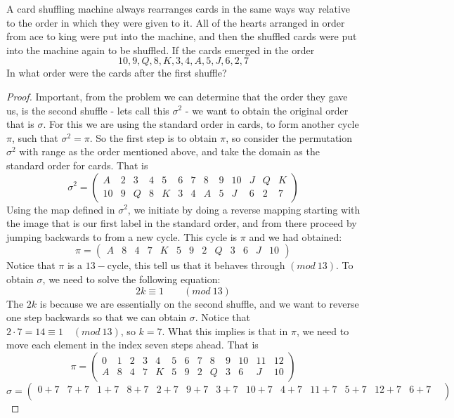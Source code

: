 \begin{assignment}[
  header=HeaderA,
  body=BodyA,
  title={Homework 3},
  duedate={26 February, 2026},
  toc=false,
  toctitle={This appears on the Table of contents.},
  exlist=false
]
\begin{exer}[Problem 5.74]
A card shuffling machine always rearranges cards in the same ways way relative to the order in which they were given to it. All of the hearts arranged in order from ace to king were put into the machine, and then the shuffled cards were put into the machine again to be shuffled. If the cards emerged in the order 
$$10,9, Q,8,K,3,4,A,5,J,6,2,7$$
In what order were the cards after the first shuffle?
\begin{proof}
Important, from the problem we can determine that the order they gave us, is the second shuffle - lets call this $\sigma^2$ - we want to obtain the original order that is $\sigma$. For this we are using the standard order in cards, to form another cycle $\pi$, such that $\sigma^2 = \pi$. So the first step is to obtain $\pi$, so consider the permutation $\sigma^2$ with range as the order mentioned above, and take the domain as the standard order for cards. That is
\[
\sigma^2 = \begin{pmatrix}
  A & 2  & 3 & 4 & 5 & 6 & 7 & 8 & 9 & 10 & J & Q & K \\
  10 & 9 & Q & 8 & K & 3 & 4 & A & 5  & J & 6 & 2 & 7 
\end{pmatrix}
\]
Using the map defined in $\sigma^2$, we initiate by doing a reverse mapping starting with the image that is our first label in the standard order, and from there proceed by jumping backwards to from a new cycle. This cycle is $\pi$ and we had obtained:
\[
\pi = \begin{pmatrix}
  A & 8 & 4  & 7 & K & 5 & 9 & 2 & Q & 3 & 6  & J & 10 
\end{pmatrix}
\]
Notice that $\pi$ is a $13-$cycle, this tell us that it behaves through $(mod\ 13)$. To obtain $\sigma$, we need to solve the following equation: 
\[
2k \equiv 1 \quad \quad (mod\ 13)
\]
The $2k$ is because we are essentially on the second shuffle, and we want to reverse one step backwards so that we can obtain $\sigma$. Notice that $2\cdot 7 = 14 \equiv 1 \quad (mod\ 13)$, so $k = 7$. What this implies is that in $\pi$, we need to move each element in the index seven steps ahead. That is 
\[
\pi = \begin{pmatrix}
  0 & 1 & 2  & 3 & 4 & 5 & 6 & 7 & 8 & 9 & 10 & 11 & 12\\
  A & 8 & 4  & 7 & K & 5 & 9 & 2 & Q & 3 & 6  & J & 10 
\end{pmatrix} 
\]
\[
\sigma = \begin{pmatrix}
  0 + 7 & 7 + 7 & 1 + 7  & 8 + 7 & 2 + 7 & 9 + 7 &3 + 7 & 10 + 7 &  4 + 7 & 11 + 7 & 5 + 7  & 12 + 7 & 6 + 7 & \\

\end{pmatrix}\]
\end{proof}
\end{exer}
\end{assignment}
